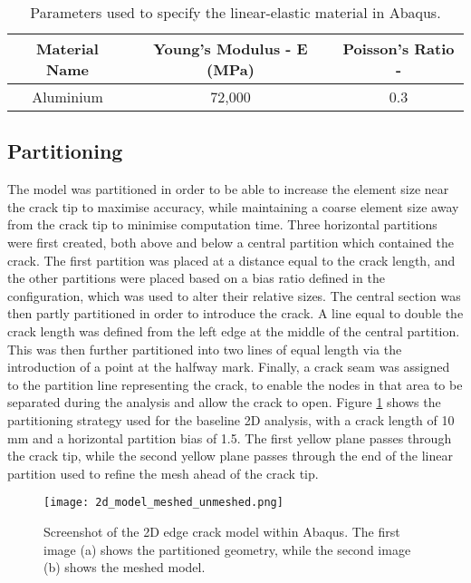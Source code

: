 \begin{table}[htbp]
	\centering
	\caption{Parameters used to specify the linear-elastic material in Abaqus.}
	\label{tab:material_params}
	\begin{tabular}{|c|c|c|}
		\hline
		\textbf{Material Name} & \textbf{Young's Modulus - E (MPa)} & \textbf{Poisson's Ratio - \bm{$\nu$}} \\ \hline
		Aluminium & 72,000 & 0.3 \\ \hline
	\end{tabular}
\end{table}

\subsection{Partitioning}

The model was partitioned in order to be able to increase the element size near the crack tip to maximise accuracy, while maintaining a coarse element size away from the crack tip to minimise computation time. Three horizontal partitions were first created, both above and below a central partition which contained the crack. The first partition was placed at a distance equal to the crack length, and the other partitions were placed based on a bias ratio defined in the configuration, which was used to alter their relative sizes. The central section was then partly partitioned in order to introduce the crack. A line equal to double the crack length was defined from the left edge at the middle of the central partition. This was then further partitioned into two lines of equal length via the introduction of a point at the halfway mark. Finally, a crack seam was assigned to the partition line representing the crack, to enable the nodes in that area to be separated during the analysis and allow the crack to open. Figure \ref{fig:2d_fea_model_meshed_unmeshed} shows the partitioning strategy used for the baseline 2D analysis, with a crack length of 10 mm and a horizontal partition bias of 1.5. The first yellow plane passes through the crack tip, while the second yellow plane passes through the end of the linear partition used to refine the mesh ahead of the crack tip.

\begin{figure}[H]
	\centering
	\texttt{[image: 2d\_model\_meshed\_unmeshed.png]}
	\caption{Screenshot of the 2D edge crack model within Abaqus. The first image (a) shows the partitioned geometry, while the second image (b) shows the meshed model.}
	\label{fig:2d_fea_model_meshed_unmeshed}
\end{figure}

